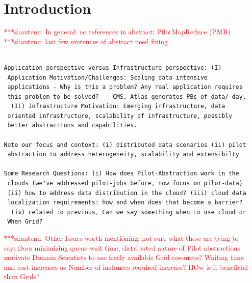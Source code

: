 \documentclass[times]{cpeauth}
\newcommand{\jhanote}[1]{ {\textcolor{red} { ***shantenu: #1 }}}
\newcommand{\jhanote}[1]{}
\newcommand{\pilotmapreduce}{PilotMapReduce\xspace}
\begin{document}

\maketitle


\vspace{-6pt}

\section{Introduction}
\vspace{-2pt}

\jhanote{In general: no references in abstract: \pilotmapreduce
  (PMR)~\cite{Mantha:2012:PEF:2287016.2287020} } \jhanote{last few
  sentences of abstract need fixing}


\begin{verbatim}

Application perspective versus Infrastructure perspective: (I)
 Application Motivation/Challenges: Scaling data intensive
 applications - Why is this a problem? Any real application requires
 this problem to be solved?  - CMS, Atlas generates PBs of data/ day.
  (II) Infrastructure Motivation: Emerging infrastructure, data
 oriented infrastructure, scalability of infrastructure, possibly
 better abstractions and capabilities.

Note our focus and context: (i) distributed data scenarios (ii) pilot
 abstraction to address heterogeneity, scalability and extensibilty

Some Research Questions: (i) How does Pilot-Abstraction work in the
 clouds (we've addressed pilot-jobs before, now focus on pilot-data)
 (ii) how to address data distribution in the cloud? (iii) cloud data
 localization requirements: how and when does that become a barrier?
  (iv) related to previous, Can we say something when to use cloud or
 When Grid?

\end{verbatim}

\jhanote{Other Issues worth mentioning: not sure what these are tying
 to say: Does minimizing queue wait time, distributed nature of
 Pilot-abstractions motivate Domain Scientists to use freely available
 Grid resources?  Waiting time and cost increases as Number of
 instances required increase?  HOw is it beneficial than Grids?}
\end{document}
